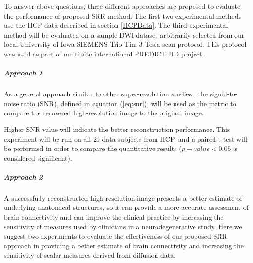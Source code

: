 To answer above questions, three different approaches are proposed to evaluate the performance of proposed SRR method.
The first two experimental methods use the HCP data described in section \ref{HCPData}. The third experimental method will be evaluated on a sample DWI dataset arbitrarily selected from our local University of Iowa
SIEMENS Trio Tim $3$ Tesla scan protocol. This protocol was used as part of multi-site international PREDICT-HD \cite{PREDICTHD} project.

\subparagraph*{Approach 1}

As a general approach similar to other super-resolution studies \cite{brown2014,shi2015,ongie2015}, the signal-to-noise ratio (SNR), defined in equation (\ref{eq:snr}), will be used as the metric to compare the recovered high-resolution image to the original image.

Higher SNR value will indicate the better reconstruction performance.
This experiment will be run on all $20$ data subjects from HCP, and a paired t-test will be performed in order to compare the quantitative results ($p-value < 0.05$ is considered significant).

\subparagraph*{Approach 2}

A successfully reconstructed high-resolution image presents a better estimate of underlying anatomical structures, so it can provide a more accurate assessment of brain connectivity and can improve the clinical practice by increasing the sensitivity of measures used by clinicians in a neurodegenerative study.
Here we suggest two experiments to evaluate the effectiveness of our proposed SRR approach in providing a better estimate of brain connectivity and increasing the sensitivity of scalar measures derived from diffusion data.

